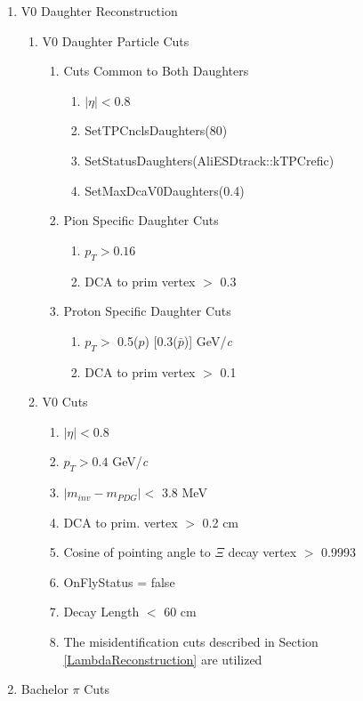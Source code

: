 \documentclass[../AnalysisNoteJBuxton.tex]{subfiles}
\begin{document}
\begin{enumerate}
 \item V0 Daughter Reconstruction
 \begin{enumerate}
  \item V0 Daughter Particle Cuts
   \begin{enumerate}
    \item{Cuts Common to Both Daughters}
    \begin{enumerate}
     \item $|\eta| < 0.8$
     \item SetTPCnclsDaughters(80)
     \item SetStatusDaughters(AliESDtrack::kTPCrefic)
     \item SetMaxDcaV0Daughters(0.4)
    \end{enumerate}
    \item Pion Specific Daughter Cuts 
    \begin{enumerate}
     \item $p_{T} > 0.16$
     \item DCA to prim vertex $>$ 0.3
    \end{enumerate}
    \item Proton Specific Daughter Cuts
    \begin{enumerate}
     \item $p_{T} > $ 0.5($p$) [0.3($\bar{p}$)] GeV/\textit{c}
     \item DCA to prim vertex $>$ 0.1 
    \end{enumerate}
   \end{enumerate}
  \item V0 Cuts  
  \begin{enumerate}
   \item $|\eta| < 0.8$
   \item $p_{T} > 0.4$ GeV/\textit{c}
   \item $|m_{inv} - m_{PDG}| <$ 3.8 MeV
   \item DCA to prim. vertex $>$ 0.2 cm   
   \item Cosine of pointing angle to $\Xi$ decay vertex $>$ 0.9993
   \item OnFlyStatus = false
   \item Decay Length $<$ 60 cm
   \item The misidentification cuts described in Section \ref{LambdaReconstruction} are utilized 
  \end{enumerate} 
 \end{enumerate}
 \item Bachelor $\pi$ Cuts

\end{enumerate}
\end{document}
